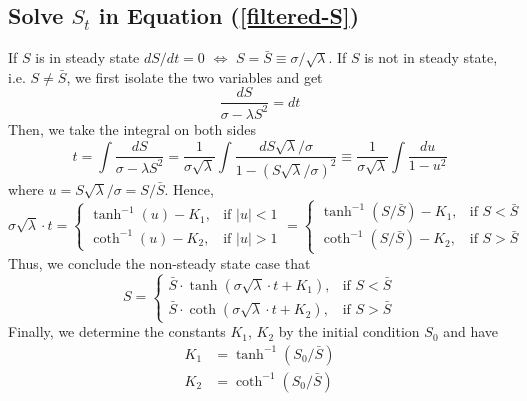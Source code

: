 \documentclass[mnsc]{informs3}
\begin{document}
\newpage
\begin{APPENDICES}





\section{Solve $S_t$ in Equation (\ref{filtered-S})}\label{app-S-equ}

If $S$ is in steady state $dS/dt = 0$ $\Leftrightarrow$ $S = \bar{S} \equiv \sigma/\sqrt{\lambda}$. 
If $S$ is not in steady state, i.e. $S\not=\bar{S}$, we first isolate the two variables and get 
\begin{equation*}
	\frac{dS}{\sigma-\lambda S^2} = dt
\end{equation*}
Then, we take the integral on both sides
\begin{equation*}
    t = \int \frac{dS}{\sigma-\lambda S^2} = \frac{1}{\sigma\sqrt{\lambda}} \int \frac{dS\sqrt{\lambda}/\sigma}{1 - (S\sqrt{\lambda}/\sigma)^2} \equiv \frac{1}{\sigma\sqrt{\lambda}}\int \frac{du}{1-u^2} 
\end{equation*}
where $u = S\sqrt{\lambda}/\sigma = S/\bar{S}$. Hence, 
\begin{equation*}
    \sigma\sqrt{\lambda}\cdot t = \begin{cases}
        \tanh^{-1}(u)-K_1, & \text{if } |u|<1\\
        \coth^{-1}(u)-K_2, & \text{if } |u|>1
    \end{cases} = \begin{cases}
        \tanh^{-1}(S/\bar{S})-K_1, & \text{if } S<\bar{S}\\
        \coth^{-1}(S/\bar{S})-K_2, & \text{if } S>\bar{S} 
\end{cases}
\end{equation*}
Thus, we conclude the non-steady state case that 
\begin{equation*}
	S = \begin{cases}
		\bar{S}\cdot\tanh(\sigma\sqrt{\lambda}\cdot t + K_1), & \text{if } S<\bar{S}\\
		\bar{S}\cdot\coth(\sigma\sqrt{\lambda}\cdot t + K_2), & \text{if } S>\bar{S} 
	\end{cases}
\end{equation*}
Finally, we determine the constants $K_1$, $K_2$ by the initial condition $S_0$ and have 
\begin{align*}
	K_1 &= \tanh^{-1}(S_0/\bar{S})\\
	K_2 &= \coth^{-1}(S_0/\bar{S})
\end{align*}










\end{APPENDICES}
\end{document}
